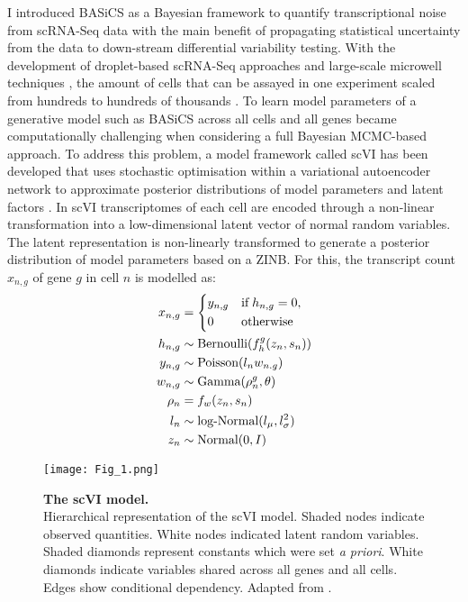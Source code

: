 I introduced BASiCS as a Bayesian framework to quantify transcriptional noise from scRNA-Seq data with the main benefit of propagating statistical uncertainty from the data to down-stream differential variability testing.
With the development of droplet-based scRNA-Seq approaches \citep{Macosko2015, Klein2015} and large-scale microwell techniques \citep{Han2018}, the amount of cells that can be assayed in one experiment scaled from hundreds to hundreds of thousands \citep{Svensson2018}. 
To learn model parameters of a generative model such as BASiCS across all cells and all genes became computationally challenging when considering a full Bayesian MCMC-based approach. 
To address this problem, a model framework called \gls{scVI} has been developed that uses stochastic optimisation within a variational autoencoder network to approximate posterior distributions of model parameters and latent factors \citep{Lopez2018}. 
In scVI transcriptomes of each cell are encoded through a non-linear transformation into a low-dimensional latent vector of normal random variables. \\

The latent representation is non-linearly transformed to generate a posterior distribution of model parameters based on a ZINB. 
For this, the transcript count $x_{n,g}$ of gene $g$ in cell $n$ is modelled as:\\

\begin{align*}
x_{n,g} & = 
 \left\lbrace
  \begin{aligned}
    & y_{n,g} && \textnormal{if} \; h_{n,g} = 0,  \\ 
    & 0 && \textnormal{otherwise}    	    
  \end{aligned}
\right.\\
h_{n,g} & \sim \textnormal{Bernoulli}(f_h^g(z_n,s_n))\\
y_{n,g} & \sim \textnormal{Poisson}(l_nw_{n.g})\\
w_{n,g} & \sim \textnormal{Gamma}(\rho^g_n, \theta)\\
\rho_n & = f_w(z_n,s_n)\\
l_n & \sim \textnormal{log-Normal}(l_{\mu},l^2_{\sigma})\\
z_n & \sim \textnormal{Normal}(0,I)
\end{align*}

\newpage

\begin{wrapfigure}{r}{0.5\textwidth}
\centering    
\texttt{[image: Fig\_1.png]}
\caption[The scVI model.]{\textbf{The scVI model.} \\
Hierarchical representation of the scVI model. 
Shaded nodes indicate observed quantities. 
White nodes indicated latent random variables. 
Shaded diamonds represent constants which were set \emph{a priori}. 
White diamonds indicate variables shared across all genes and all cells. 
Edges show conditional dependency. Adapted from \citep{Lopez2018}.}
\label{fig0:scVI}
\end{wrapfigure}

